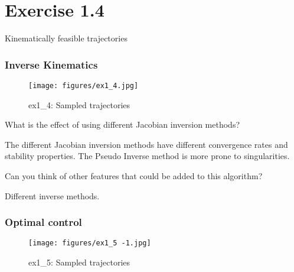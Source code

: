 \section*{Exercise 1.4}
Kinematically feasible trajectories

\subsubsection*{Inverse Kinematics}

\begin{figure*}[htbp]
    \centering
    \texttt{[image: figures/ex1\_4.jpg]}
    \caption{ex1\_4: Sampled trajectories}
\end{figure*}

What is the effect of using different Jacobian inversion methods?

The different Jacobian inversion methods have different convergence rates and stability properties.
The Pseudo Inverse method is more prone to singularities.

Can you think of other features that could be added to this algorithm?

Different inverse methods.

\subsubsection*{Optimal control}

\begin{figure*}[htbp]
    \centering
    \texttt{[image: figures/ex1\_5 -1.jpg]}
    \caption{ex1\_5: Sampled trajectories}
\end{figure*}
